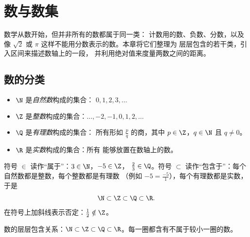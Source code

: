 \chapter{数与数集}\label{ch:g10:numbers}

数学从数开始，但并非所有的数都属于同一类：
计数用的数、负数、分数，以及像 $\sqrt 2$
或 $\pi$ 这样不能用分数表示的数。本章将它们整理为
层层包含的若干类，引入区间来描述数轴上的一段，
并利用绝对值来度量两数之间的距离。

\section{数的分类}

\begin{definition}[数集]\label{def:g10:numbers:sets}
\begin{itemize}
  \item $\N$ 是\emph{自然数}构成的集合：
        $0, 1, 2, 3, \dots$
  \item $\Z$ 是\emph{整数}构成的集合：$\dots, -2, -1,
        0, 1, 2, \dots$
  \item $\Q$ 是\emph{有理数}构成的集合：
        所有形如 $\frac{p}{q}$ 的商，其中 $p \in \Z$，$q \in \N$ 且
        $q \neq 0$。
  \item $\R$ 是\emph{实数}构成的集合：所有
        能够放置在数轴上的数。
\end{itemize}
\end{definition}

\begin{notation}
符号 $\in$ 读作“属于”：$3 \in \N$，$-5 \in \Z$，
$\frac23 \in \Q$。符号 $\subset$ 读作“包含于”：每个
自然数都是整数，每个整数都是有理数
（例如 $-5 = \frac{-5}{1}$），每个有理数都是实数，于是
\[
\N \subset \Z \subset \Q \subset \R .
\]
在符号上加斜线表示否定：$\frac12 \notin \Z$。
\end{notation}

\begin{omfigure}

{\small 数的层层包含关系：$\N \subset \Z \subset \Q \subset
\R$。每一圈都含有不属于较小一圈的数。}
\end{omfigure}

